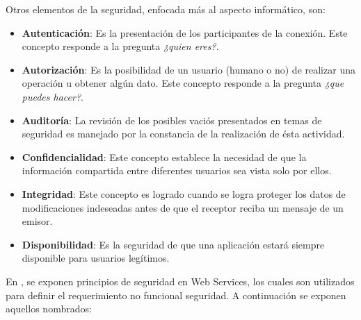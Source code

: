 Otros elementos de la seguridad, enfocada más al aspecto informático, son:

\begin{itemize}
 \item \textbf{Autenticación}: Es la presentación de los participantes de la conexión. Este concepto responde a la pregunta \textit{¿quien eres?}.
 \item \textbf{Autorización}: Es la posibilidad de un usuario (humano o no) de realizar una operación u obtener algún dato. Este concepto responde a la pregunta \textit{¿que puedes hacer?}.
 \item \textbf{Auditoría}: La revisión de los posibles vaciós presentados en temas de seguridad es manejado por la constancia de la realización de ésta actividad.
 \item \textbf{Confidencialidad}: Este concepto establece la necesidad de que la información compartida entre diferentes usuarios sea vista solo por ellos.
 \item \textbf{Integridad}: Este concepto es logrado cuando se logra proteger los datos de modificaciones indeseadas antes de que el receptor reciba un mensaje de un emisor.
 \item \textbf{Disponibilidad}: Es la seguridad de que una aplicación estará siempre disponible para usuarios legítimos.
\end{itemize}

En \cite{security_ws}, se exponen principios de seguridad en Web Services, los cuales son utilizados para definir el requerimiento no funcional seguridad. A continuación se exponen aquellos nombrados:

